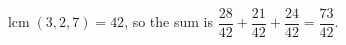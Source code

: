 $\operatorname{lcm}(3,2,7)=42$, so the sum is $\dfrac{28}{42}+\dfrac{21}{42}+\dfrac{24}{42}=\boxed{\dfrac{73}{42}}$.
